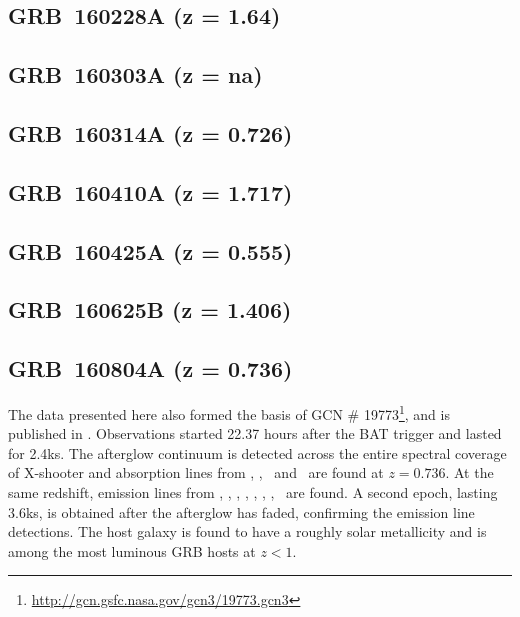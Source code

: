 \documentclass{aa}    %
\begin{document}
\subsection{GRB~160228A (z = 1.64)}	



\subsection{GRB~160303A (z = na)}	



\subsection{GRB~160314A (z = 0.726)}	



\subsection{GRB~160410A (z = 1.717)}	



\subsection{GRB~160425A (z = 0.555)}	



\subsection{GRB~160625B (z = 1.406)}	



\subsection{GRB~160804A (z = 0.736)}
The data presented here also formed the basis of GCN \#
19773\footnote{\url{http://gcn.gsfc.nasa.gov/gcn3/19773.gcn3}}, and is
published in \citet{Heintz2017b}. Observations started 22.37 hours after the
BAT trigger and lasted for 2.4ks. The afterglow continuum is detected across the entire
spectral coverage of X-shooter and absorption lines from \mgi, \mgii, \feii~and
\alii~are found at $z = 0.736$. At the same redshift, emission lines from \oii,
\oiii, \ha, \hb, \hg, \nii, \sii, \siii~are found. A second epoch, lasting
3.6ks, is obtained after the afterglow has faded, confirming the emission line
detections. The host galaxy is found to have a roughly solar metallicity and is
among the most luminous GRB hosts at $z < 1$.
\end{document}
